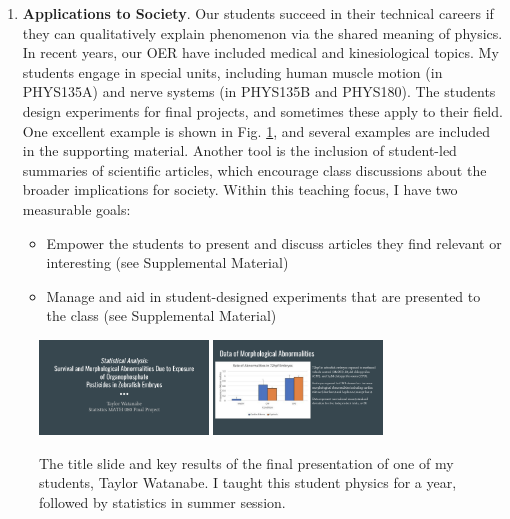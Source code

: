 \documentclass[../../../main.tex]{subfiles}
\begin{document}
\begin{enumerate}
\item \textbf{Applications to Society}. Our students succeed in their technical careers if they can qualitatively explain phenomenon via the shared meaning of physics.  In recent years, our OER \cite{openstax1} \cite{openstax2} have included medical and kinesiological topics.  My students engage in special units, including human muscle motion (in PHYS135A) and nerve systems (in PHYS135B and PHYS180).  The students design experiments for final projects, and sometimes these apply to their field.  One excellent example is shown in Fig. \ref{fig:taylor_1}, and several examples are included in the supporting material. Another tool is the inclusion of student-led summaries of scientific articles, which encourage class discussions about the broader implications for society.  Within this teaching focus, I have two measurable goals:

\begin{itemize}
\item Empower the students to present and discuss articles they find relevant or interesting (see Supplemental Material)
\item Manage and aid in student-designed experiments that are presented to the class (see Supplemental Material)
\end{itemize}

\end{enumerate}

\begin{figure}
\centering
\includegraphics[width=0.4\textwidth]{figures/taylor1.png}
\includegraphics[width=0.4\textwidth]{figures/taylor2.png}
\caption{\label{fig:taylor_1} The title slide and key results of the final presentation of one of my students, Taylor Watanabe.  I taught this student physics for a year, followed by statistics in summer session.}
\end{figure}
\end{document}
